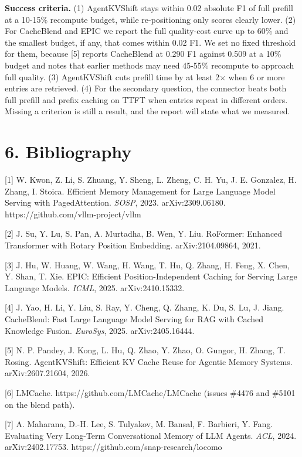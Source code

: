 \documentclass[
  10pt,
]{article}
\begin{document}
\textbf{Success criteria.} (1) AgentKVShift stays within 0.02 absolute
F1 of full prefill at a 10-15\% recompute budget, while re-positioning
only scores clearly lower. (2) For CacheBlend and EPIC we report the
full quality-cost curve up to 60\% and the smallest budget, if any, that
comes within 0.02 F1. We set no fixed threshold for them, because {[}5{]}
reports CacheBlend at 0.290 F1 against 0.509 at a 10\% budget and notes
that earlier methods may need 45-55\% recompute to approach full
quality. (3) AgentKVShift cuts prefill time by at least 2× when 6 or
more entries are retrieved. (4) For the secondary question, the
connector beats both full prefill and prefix caching on TTFT when
entries repeat in different orders. Missing a criterion is still a
result, and the report will state what we measured.

\section{6. Bibliography}\label{bibliography}

\small

{[}1{]} W. Kwon, Z. Li, S. Zhuang, Y. Sheng, L. Zheng, C. H. Yu, J. E.
Gonzalez, H. Zhang, I. Stoica. Efficient Memory Management for Large
Language Model Serving with PagedAttention. \emph{SOSP}, 2023.
arXiv:2309.06180. https://github.com/vllm-project/vllm

{[}2{]} J. Su, Y. Lu, S. Pan, A. Murtadha, B. Wen, Y. Liu. RoFormer:
Enhanced Transformer with Rotary Position Embedding. arXiv:2104.09864,
2021.

{[}3{]} J. Hu, W. Huang, W. Wang, H. Wang, T. Hu, Q. Zhang, H. Feng, X.
Chen, Y. Shan, T. Xie. EPIC: Efficient Position-Independent Caching for
Serving Large Language Models. \emph{ICML}, 2025. arXiv:2410.15332.

{[}4{]} J. Yao, H. Li, Y. Liu, S. Ray, Y. Cheng, Q. Zhang, K. Du, S. Lu,
J. Jiang. CacheBlend: Fast Large Language Model Serving for RAG with
Cached Knowledge Fusion. \emph{EuroSys}, 2025. arXiv:2405.16444.

{[}5{]} N. P. Pandey, J. Kong, L. Hu, Q. Zhao, Y. Zhao, O. Gungor, H.
Zhang, T. Rosing. AgentKVShift: Efficient KV Cache Reuse for Agentic
Memory Systems. arXiv:2607.21604, 2026.

{[}6{]} LMCache. https://github.com/LMCache/LMCache (issues \#4476 and
\#5101 on the blend path).

{[}7{]} A. Maharana, D.-H. Lee, S. Tulyakov, M. Bansal, F. Barbieri, Y.
Fang. Evaluating Very Long-Term Conversational Memory of LLM Agents.
\emph{ACL}, 2024. arXiv:2402.17753.
https://github.com/snap-research/locomo
\end{document}
